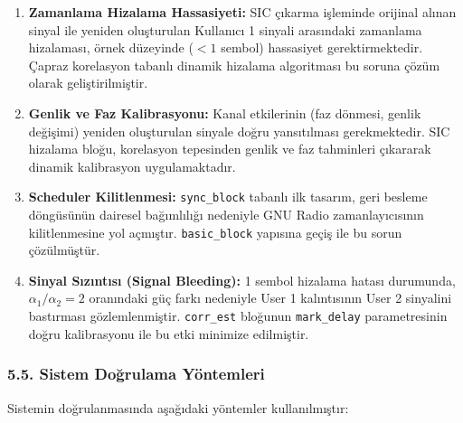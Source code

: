 \documentclass[
]{IEEEtran}
\begin{document}
\begin{enumerate}
\def\labelenumi{\arabic{enumi}.}
\item
  \textbf{Zamanlama Hizalama Hassasiyeti:} SIC çıkarma işleminde
  orijinal alınan sinyal ile yeniden oluşturulan Kullanıcı 1 sinyali
  arasındaki zamanlama hizalaması, örnek düzeyinde (\(< 1\) sembol)
  hassasiyet gerektirmektedir. Çapraz korelasyon tabanlı dinamik
  hizalama algoritması bu soruna çözüm olarak geliştirilmiştir.
\item
  \textbf{Genlik ve Faz Kalibrasyonu:} Kanal etkilerinin (faz dönmesi,
  genlik değişimi) yeniden oluşturulan sinyale doğru yansıtılması
  gerekmektedir. SIC hizalama bloğu, korelasyon tepesinden genlik ve faz
  tahminleri çıkararak dinamik kalibrasyon uygulamaktadır.
\item
  \textbf{Scheduler Kilitlenmesi:} \texttt{sync\_block} tabanlı ilk
  tasarım, geri besleme döngüsünün dairesel bağımlılığı nedeniyle GNU
  Radio zamanlayıcısının kilitlenmesine yol açmıştır.
  \texttt{basic\_block} yapısına geçiş ile bu sorun çözülmüştür.
\item
  \textbf{Sinyal Sızıntısı (Signal Bleeding):} 1 sembol hizalama hatası
  durumunda, \(\alpha_1/\alpha_2 = 2\) oranındaki güç farkı nedeniyle
  User 1 kalıntısının User 2 sinyalini bastırması gözlemlenmiştir.
  \texttt{corr\_est} bloğunun \texttt{mark\_delay} parametresinin doğru
  kalibrasyonu ile bu etki minimize edilmiştir.
\end{enumerate}

\subsubsection{5.5. Sistem Doğrulama
Yöntemleri}\label{sistem-doux11frulama-yuxf6ntemleri}

Sistemin doğrulanmasında aşağıdaki yöntemler kullanılmıştır:
\end{document}
